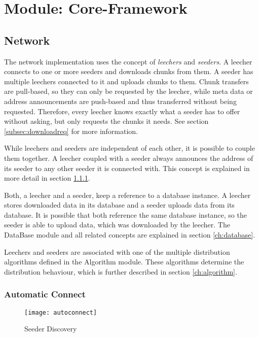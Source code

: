 \chapter{Module: Core-Framework}
\label{ch:core}

\section{Network}
The network implementation uses the concept of \emph{leechers} and \emph{seeders}. A leecher connects to one or more seeders and downloads chunks from them. A seeder has multiple leechers connected to it and uploads chunks to them. Chunk transfers are pull-based, so they can only be requested by the leecher, while meta data or address announcements are push-based and thus transferred without being requested. Therefore, every leecher knows exactly what a seeder has to offer without asking, but only requests the chunks it needs. See section \ref{subsec:downloadreq} for more information.

While leechers and seeders are independent of each other, it is possible to couple them together. A leecher coupled with a seeder always announces the address of its seeder to any other seeder it is connected with. This concept is explained in more detail in section \ref{subsec:autoconnect}.

Both, a leecher and a seeder, keep a reference to a database instance. A leecher stores downloaded data in its database and a seeder uploads data from its database. It is possible that both reference the same database instance, so the seeder is able to upload data, which was downloaded by the leecher. The DataBase module and all related concepts are explained in section \ref{ch:database}.

Leechers and seeders are associated with one of the multiple distribution algorithms defined in the Algorithm module. These algorithms determine the distribution behaviour, which is further described in section \ref{ch:algorithm}.


\subsection{Automatic Connect}
\label{subsec:autoconnect}

\begin{figure}[ht]
	\centering
	\texttt{[image: autoconnect]}
	\caption{Seeder Discovery}
	\label{fig:autoconnect}
\end{figure}

